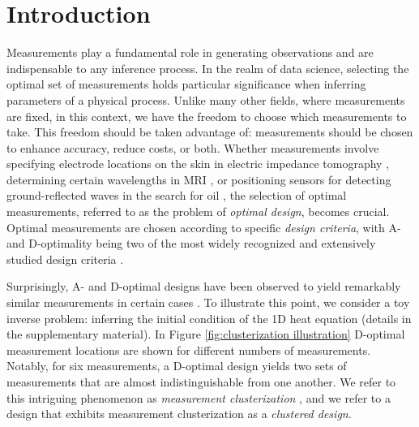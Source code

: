 \section{Introduction}\label{section:intro}
Measurements play a fundamental role in generating observations and
are indispensable to any inference process. In the realm of data
science, selecting the optimal set of measurements holds particular
significance when inferring parameters of a physical process. Unlike
many other fields, where measurements are fixed, in this context, we
have the freedom to choose which measurements to take. This freedom
should be taken advantage of: measurements should be chosen to enhance
accuracy, reduce costs, or both. Whether measurements involve
specifying electrode locations on the skin in electric impedance
tomography \cite{horesh2010impedance}, determining certain wavelengths
in MRI \cite{horesh2008mri}, or positioning sensors for detecting
ground-reflected waves in the search for oil
\cite{horesh2008borehole}, the selection of optimal measurements,
referred to as the problem of \emph{optimal design}, becomes
crucial. Optimal measurements are chosen according to specific
\emph{design criteria}, with A- and D-optimality being two of the most
widely recognized and extensively studied design criteria
\cite{Chaloner1995}.


Surprisingly, A- and D-optimal designs have been observed to yield
remarkably similar measurements in certain cases \cite{fedorov1996,
  hooker2009, fedorov2012, Ucinski05, neitzel2019sparse}. To
illustrate this point, we consider a toy inverse problem: inferring
the initial condition of the 1D heat equation (details in the
supplementary material). In Figure \ref{fig:clusterization
  illustration} D-optimal measurement locations are shown for
different numbers of measurements. Notably, for six measurements, a
D-optimal design yields two sets of measurements that are almost
indistinguishable from one another. We refer to this intriguing
phenomenon as \emph{measurement clusterization} \cite{Ucinski05}, and
we refer to a design that exhibits measurement clusterization as a
\emph{clustered design}.


